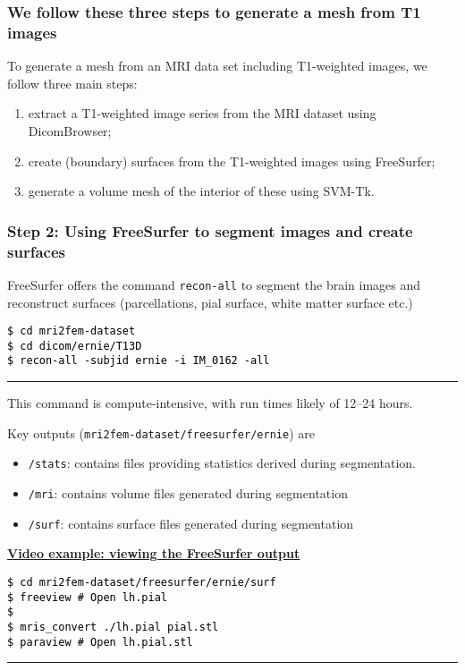 \documentclass[10pt, mathserif, aspectratio=169, t, usenames, dvipsnames]{beamer}
\newcommand{\videosection}[3]{\begin{frame} \begin{center} \vspace{3em} \href{#2}{\textcolor{rognesred}{\textbf{#1}}} \end{center} #3 \end{frame}}
\def\formtmpX#1#2{{\vskip3pt\noindent\fboxsep=0pt{\parbox{\textwidth}{\hbox to \textwidth{\hskip3pt\vbox{\raggedright\noindent\textbf{#2\vphantom{Qy}}}\hfill}}}\vskip3pt\par
\noindent\kern0pt}}
\newenvironment{programcode}[1]{\ignorespaces\def\stmtopen##1{##1}%
\formtmpX{programcode}{\centerline{\small{#1}}}}{\noindent\textcolor{programcode}{\rule{\columnwidth}{0pt}}\par\addvspace{\baselineskip}}%
\newcommand{\terminal}[1]{
  \vspace{-1em}
  \begin{programcode}{}%
    \colorbox{blue!10}{\parbox{0.98\textwidth}{\textcolor{black}{\texttt{#1}}}}
  \end{programcode}
  \vspace{-0.5em}
}
\newcommand{\emp}[1]{\texttt{#1}}
\begin{document}
\begin{frame}
\frametitle{We follow these three steps to generate a mesh from T1 images}

To generate a mesh from an MRI data set including T1-weighted images,
we follow three main steps:
\bigskip
\begin{enumerate}
\item
  extract a T1-weighted image series from the MRI dataset using DicomBrowser;
\item
  create (boundary) surfaces from the T1-weighted images using FreeSurfer;
\item 
  generate a volume mesh of the interior of these using SVM-Tk.
\end{enumerate}
\end{frame}

\begin{frame}
\frametitle{Step 2: Using FreeSurfer to segment images and create surfaces}

FreeSurfer offers the command \emp{recon-all} to segment the brain
images and reconstruct surfaces (parcellations, pial surface, white
matter surface etc.)

\terminal{\$ cd mri2fem-dataset \\
\$ cd dicom/ernie/T13D \\
\$ recon-all -subjid ernie -i IM\_0162 -all}

This command is compute-intensive, with run times likely of 12--24
hours.

Key outputs (\emp{mri2fem-dataset/freesurfer/ernie}) are 
\begin{itemize}
\item \emp{/stats}: contains files providing statistics derived during segmentation.
\item \emp{/mri}: contains volume files generated during segmentation
\item \emp{/surf}: contains surface files generated during segmentation
\end{itemize}
\end{frame}

\videosection{Video example: viewing the FreeSurfer output}{https://youtu.be/Svz3kYfsCQo}
{\terminal{\$ cd mri2fem-dataset/freesurfer/ernie/surf \\
\$ freeview \# Open lh.pial \\
\$ \\
\$ mris\_convert ./lh.pial pial.stl \\
\$ paraview \# Open lh.pial.stl}
}
\end{document}
